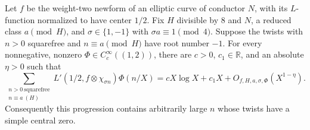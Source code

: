 \begin{lemma}\label{nv:odd-first-moment}
Let $f$ be the weight-two newform of an elliptic curve of conductor $N$,
with its $L$-function normalized to have center $1/2$.
Fix $H$ divisible by $8$ and $N$, a reduced class $a\pmod H$, and
$\sigma\in\{1,-1\}$ with $\sigma a\equiv1\pmod4$.
Suppose the twists with $n>0$ squarefree and $n\equiv a\pmod H$
have root number $-1$.
For every nonnegative, nonzero $\Phi\in C_c^\infty((1,2))$, there are
$c>0$, $c_1\in\mathbb R$, and an absolute $\eta>0$ such that
\begin{equation}\label{odd:moment}
 \sum_{\substack{n>0\ \mathrm{squarefree}\\n\equiv a\ (H)}}
 L'(1/2,f\otimes\chi_{\sigma n})\Phi(n/X)
 =cX\log X+c_1X+O_{f,H,a,\sigma,\Phi}(X^{1-\eta}).
\end{equation}
Consequently this progression contains arbitrarily large $n$ whose
twists have a simple central zero.
\end{lemma}

